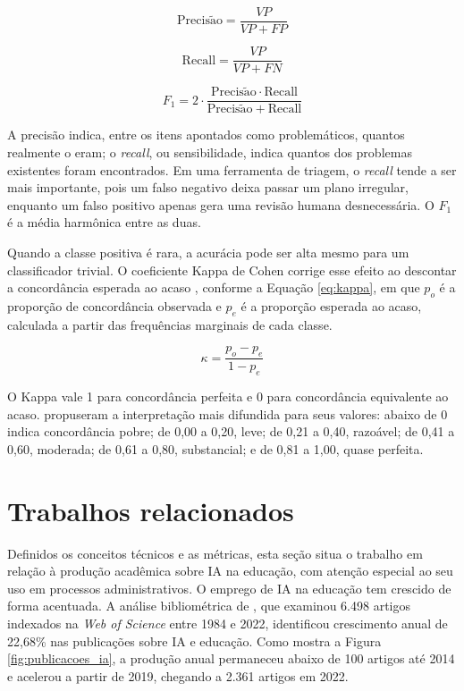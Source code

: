 \begin{equation}
\label{eq:precisao}
\mathrm{Precis\tilde{a}o} = \frac{VP}{VP + FP}
\end{equation}

\begin{equation}
\label{eq:recall}
\mathrm{Recall} = \frac{VP}{VP + FN}
\end{equation}

\begin{equation}
\label{eq:f1}
F_1 = 2 \cdot \frac{\mathrm{Precis\tilde{a}o} \cdot \mathrm{Recall}}{\mathrm{Precis\tilde{a}o} + \mathrm{Recall}}
\end{equation}

A precisão indica, entre os itens apontados como problemáticos, quantos realmente o eram; o \textit{recall}, ou sensibilidade, indica quantos dos problemas existentes foram encontrados. Em uma ferramenta de triagem, o \textit{recall} tende a ser mais importante, pois um falso negativo deixa passar um plano irregular, enquanto um falso positivo apenas gera uma revisão humana desnecessária. O $F_1$ é a média harmônica entre as duas.

Quando a classe positiva é rara, a acurácia pode ser alta mesmo para um classificador trivial. O coeficiente Kappa de Cohen corrige esse efeito ao descontar a concordância esperada ao acaso \cite{Cohen1960}, conforme a Equação \ref{eq:kappa}, em que $p_o$ é a proporção de concordância observada e $p_e$ é a proporção esperada ao acaso, calculada a partir das frequências marginais de cada classe.

\begin{equation}
\label{eq:kappa}
\kappa = \frac{p_o - p_e}{1 - p_e}
\end{equation}

O Kappa vale 1 para concordância perfeita e 0 para concordância equivalente ao acaso.  propuseram a interpretação mais difundida para seus valores: abaixo de 0 indica concordância pobre; de 0,00 a 0,20, leve; de 0,21 a 0,40, razoável; de 0,41 a 0,60, moderada; de 0,61 a 0,80, substancial; e de 0,81 a 1,00, quase perfeita.

\section{Trabalhos relacionados}
\label{sec:relacionados}

Definidos os conceitos técnicos e as métricas, esta seção situa o trabalho em relação à produção acadêmica sobre IA na educação, com atenção especial ao seu uso em processos administrativos. O emprego de IA na educação tem crescido de forma acentuada. A análise bibliométrica de , que examinou 6.498 artigos indexados na \textit{Web of Science} entre 1984 e 2022, identificou crescimento anual de 22,68\% nas publicações sobre IA e educação. Como mostra a Figura \ref{fig:publicacoes_ia}, a produção anual permaneceu abaixo de 100 artigos até 2014 e acelerou a partir de 2019, chegando a 2.361 artigos em 2022.

